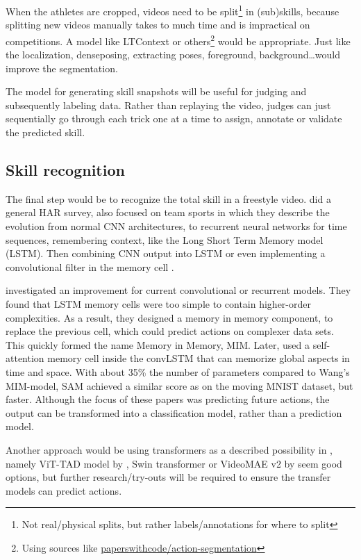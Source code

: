 When the athletes are cropped, videos need to be split\footnote{Not real/physical splits, but rather labels/annotations for where to split} in (sub)skills, because splitting new videos manually takes to much time and is impractical on competitions. A model like LTContext \textcite{Jiaming_2023} or others\footnote{Using sources like \href{https://paperswithcode.com/task/action-segmentation}{paperswithcode/action-segmentation}} would be appropriate.
Just like the localization, denseposing, extracting poses, foreground, background\dots would improve the segmentation.

The model for generating skill snapshots will
be useful for judging and subsequently labeling
data. Rather than replaying the video, judges can
just sequentially go through each trick one at a
time to assign, annotate or validate the predicted
skill.

\subsection{Skill recognition}
\label{subsec:skill-recognition}

The final step would be to recognize the total skill in a freestyle video.
\textcite{Yin_2024} did a general HAR survey, also focused on team sports in which they describe the evolution from normal CNN architectures, to recurrent neural networks for time sequences, remembering context, like the Long Short Term Memory model (LSTM). Then combining CNN output into LSTM or even implementing a convolutional filter in the memory cell \autocite{Shi_2015}.

\textcite{Wang_2019} investigated an improvement for current convolutional or recurrent models. They found that LSTM memory cells were too simple to contain higher-order complexities. As a result, they designed a memory in memory component, to replace the previous cell, which could predict actions on complexer data sets. This quickly formed the name Memory in Memory, MIM. Later, \textcite{Lin_2020} used a self-attention memory cell inside the convLSTM that can memorize global aspects in time and space. With about 35\% the number of parameters compared to Wang's MIM-model, SAM achieved a similar score as on the moving MNIST dataset, but faster. Although the focus of these papers was predicting future actions, the output can be transformed into a classification model, rather than a prediction model.

Another approach would be using transformers as a described possibility in \textcite{Yin_2024}, namely ViT-TAD model by \textcite{Yang_2023}, Swin transformer \textcite{Liu_2021} or VideoMAE v2 by \textcite{Wang_2023} seem good options, but further research/try-outs will be required to ensure the transfer models can predict actions.

